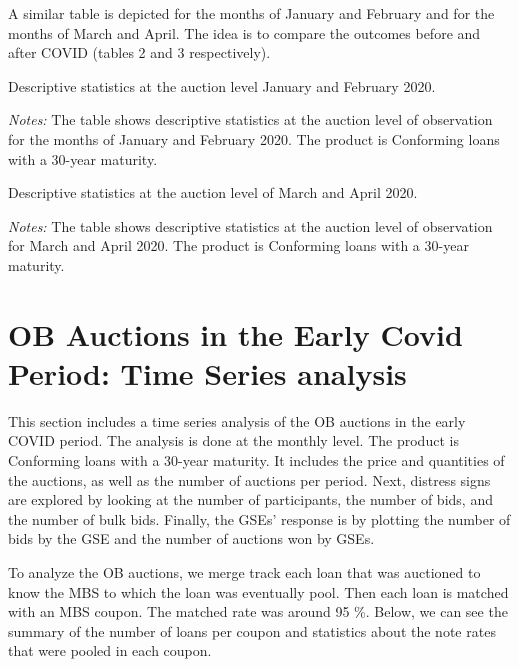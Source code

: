 \documentclass[11pt,a4paper]{article}
\begin{document}
A similar table is depicted for the months of January and February and for the months of March and April. The idea is to compare the outcomes before and after COVID (tables 2 and 3 respectively).

\begin{table}[h]
  \centering
  
  \caption{Descriptive statistics at the auction level January and February 2020. }
  \begin{minipage}{\textwidth}
      \footnotesize{\textit{Notes:} The table shows descriptive statistics at the auction level of observation for the months of January and  February 2020. The product is Conforming loans with a 30-year maturity. } 
      \end{minipage}
\end{table}

\begin{table}[h]
  \centering
  
  \caption{Descriptive statistics at the auction level of March and April 2020. }
  \begin{minipage}{\textwidth}
      \footnotesize{\textit{Notes:} The table shows descriptive statistics at the auction level of observation for March and April 2020. The product is Conforming loans with a 30-year maturity. } 
      \end{minipage}
\end{table}

\pagebreak
\section{OB Auctions in the Early Covid Period: Time Series analysis}

This section includes a time series analysis of the OB auctions in the early COVID period. The analysis is done at the monthly level. The product is Conforming loans with a 30-year maturity. It includes the price and quantities of the auctions, as well as the number of auctions per period. Next, distress signs are explored by looking at the number of participants, the number of bids, and the number of bulk bids. Finally, the GSEs' response is by plotting the number of bids by the GSE and the number of auctions won by GSEs.

To analyze the OB auctions, we merge track each loan that was auctioned to know the MBS to which the loan was eventually pool. Then each loan is matched with an MBS coupon. The matched rate was around 95 \%. Below, we can see the summary of the number of loans per coupon and statistics about the note rates that were pooled in each coupon. 
\end{document}
